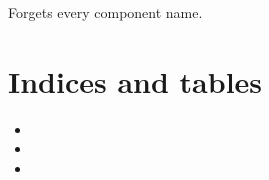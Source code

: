 \documentclass[letterpaper,10pt,english]{sphinxmanual}
\begin{document}
\begin{fulllineitems}
\label{\detokenize{generated/tamos.reset_names_list:tamos.reset_names_list}}
\pysigstartsignatures
{}
\pysigstopsignatures
\sphinxAtStartPar
Forgets every component name.

\end{fulllineitems}



\chapter{Indices and tables}
\label{\detokenize{index:indices-and-tables}}\begin{itemize}
\item {} 
\sphinxAtStartPar
{}

\item {} 
\sphinxAtStartPar
{}

\item {} 
\sphinxAtStartPar
{}

\end{itemize}



\renewcommand{\indexname}{Index}
\printindex
\end{document}
